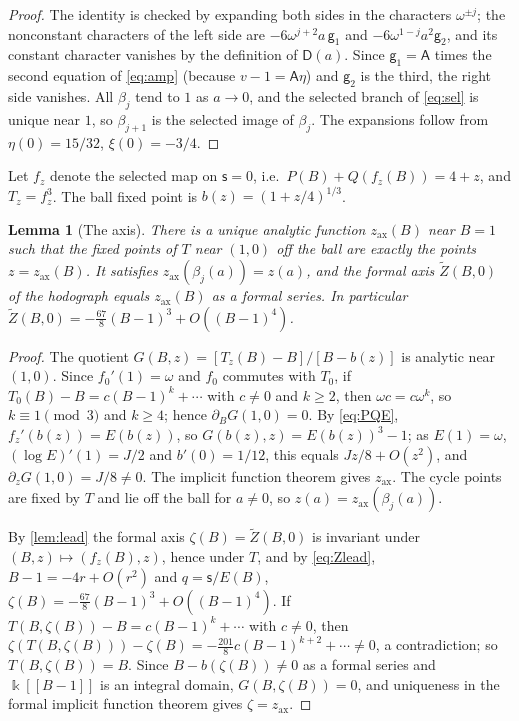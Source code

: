 \documentclass[11pt]{amsart}
\numberwithin{equation}{section}
\newtheorem{lemma}[theorem]{Lemma}
\theoremstyle{definition}
\theoremstyle{remark}
\newcommand{\kk}{\Bbbk}
\newcommand{\sA}{\mathsf A}
\newcommand{\sD}{\mathsf D}
\newcommand{\ssf}{\mathsf s}
\begin{document}
\begin{proof}
The identity is checked by expanding both sides in the characters $\omega^{\pm j}$; the nonconstant characters of the left side are $-6\omega^{j+2}a\,\mathsf g_1$ and $-6\omega^{1-j}a^2\mathsf g_2$, and its constant character vanishes by the definition of $\sD(a)$. Since $\mathsf g_1=\sA$ times the second equation of \eqref{eq:amp} (because $v-1=\sA\eta$) and $\mathsf g_2$ is the third, the right side vanishes. All $\beta_j$ tend to $1$ as $a\to0$, and the selected branch of \eqref{eq:sel} is unique near $1$, so $\beta_{j+1}$ is the selected image of $\beta_j$. The expansions follow from $\eta(0)=15/32$, $\xi(0)=-3/4$.
\end{proof}

Let $f_z$ denote the selected map on $\ssf=0$, i.e.\ $P(B)+Q(f_z(B))=4+z$, and $T_z=f_z^3$. The ball fixed point is $b(z)=(1+z/4)^{1/3}$.

\begin{lemma}[The axis]\label{lem:axis}
There is a unique analytic function $z_{\mathrm{ax}}(B)$ near $B=1$ such that the fixed points of $T$ near $(1,0)$ off the ball are exactly the points $z=z_{\mathrm{ax}}(B)$. It satisfies $z_{\mathrm{ax}}(\beta_j(a))=z(a)$, and the formal axis $\widetilde Z(B,0)$ of the hodograph equals $z_{\mathrm{ax}}(B)$ as a formal series. In particular $\widetilde Z(B,0)=-\frac{67}8(B-1)^3+O((B-1)^4)$.
\end{lemma}

\begin{proof}
The quotient $G(B,z)=[T_z(B)-B]/[B-b(z)]$ is analytic near $(1,0)$. Since $f_0'(1)=\omega$ and $f_0$ commutes with $T_0$, if $T_0(B)-B=c(B-1)^k+\cdots$ with $c\ne0$ and $k\ge2$, then $\omega c=c\omega^k$, so $k\equiv1\pmod3$ and $k\ge4$; hence $\partial_BG(1,0)=0$. By \eqref{eq:PQE}, $f_z'(b(z))=E(b(z))$, so $G(b(z),z)=E(b(z))^3-1$; as $E(1)=\omega$, $(\log E)'(1)=J/2$ and $b'(0)=1/12$, this equals $Jz/8+O(z^2)$, and $\partial_zG(1,0)=J/8\ne0$. The implicit function theorem gives $z_{\mathrm{ax}}$. The cycle points are fixed by $T$ and lie off the ball for $a\ne0$, so $z(a)=z_{\mathrm{ax}}(\beta_j(a))$.

By \cref{lem:lead} the formal axis $\zeta(B)=\widetilde Z(B,0)$ is invariant under $(B,z)\mapsto(f_z(B),z)$, hence under $T$, and by \eqref{eq:Zlead}, $B-1=-4r+O(r^2)$ and $q=\ssf/E(B)$, $\zeta(B)=-\frac{67}8(B-1)^3+O((B-1)^4)$. If $T(B,\zeta(B))-B=c(B-1)^k+\cdots$ with $c\ne0$, then $\zeta(T(B,\zeta(B)))-\zeta(B)=-\frac{201}8c(B-1)^{k+2}+\cdots\ne0$, a contradiction; so $T(B,\zeta(B))=B$. Since $B-b(\zeta(B))\ne0$ as a formal series and $\kk[[B-1]]$ is an integral domain, $G(B,\zeta(B))=0$, and uniqueness in the formal implicit function theorem gives $\zeta=z_{\mathrm{ax}}$.
\end{proof}
\end{document}
